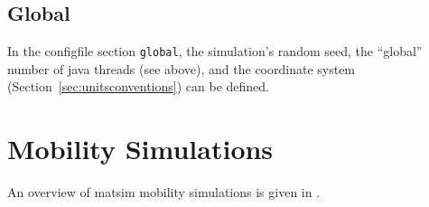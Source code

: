 

\subsection{Global}
\label{sec:using-global}
In the \gls{configfile} section \lstinline|global|, the simulation's random seed, the ``global'' number of \gls{java} threads (see above), and the coordinate system (\cf Section~\ref{sec:unitsconventions}) can be defined. 

\section{Mobility Simulations}
\label{sec:using-mobsims}
An overview of \gls{matsim} mobility simulations is given in \citet[][]{Dobler_TechRep_IVT_2011}. %

